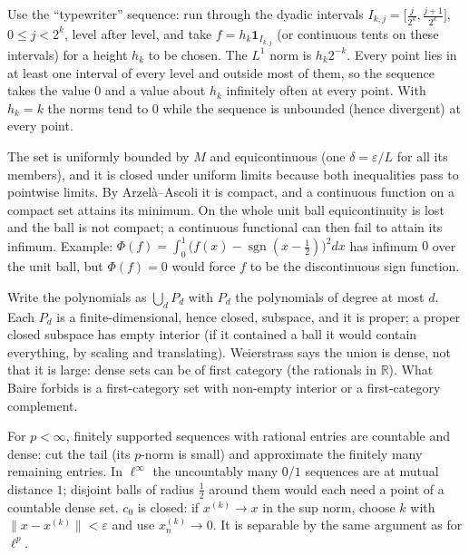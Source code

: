 \documentclass[11pt,a4paper]{article}
\begin{document}
Use the ``typewriter'' sequence: run through the dyadic intervals \(I_{k,j}=\bigl[\frac j{2^k},\frac{j+1}{2^k}\bigr]\), \(0\le j\lt2^k\), level after level, and take \(f=h_k\mathbf 1_{I_{k,j}}\) (or continuous tents on these intervals) for a height \(h_k\) to be chosen.
The \(L^1\) norm is \(h_k2^{-k}\). Every point lies in at least one interval of every level and outside most of them, so the sequence takes the value \(0\) and a value about \(h_k\) infinitely often at every point. With \(h_k=k\) the norms tend to \(0\) while the sequence is unbounded (hence divergent) at every point.

The set is uniformly bounded by \(M\) and equicontinuous (one \(\delta=\varepsilon/L\) for all its members), and it is closed under uniform limits because both inequalities pass to pointwise limits. By Arzelà--Ascoli it is compact, and a continuous function on a compact set attains its minimum.
On the whole unit ball equicontinuity is lost and the ball is not compact; a continuous functional can then fail to attain its infimum. Example: \(\Phi(f)=\int_0^1\bigl(f(x)-\operatorname{sgn}(x-\frac12)\bigr)^2dx\) has infimum \(0\) over the unit ball, but \(\Phi(f)=0\) would force \(f\) to be the discontinuous sign function.

Write the polynomials as \(\bigcup_dP_d\) with \(P_d\) the polynomials of degree at most \(d\). Each \(P_d\) is a finite-dimensional, hence closed, subspace, and it is proper; a proper closed subspace has empty interior (if it contained a ball it would contain everything, by scaling and translating).
Weierstrass says the union is dense, not that it is large: dense sets can be of first category (the rationals in \(\mathbb R\)). What Baire forbids is a first-category set with non-empty interior or a first-category complement.

For \(p\lt\infty\), finitely supported sequences with rational entries are countable and dense: cut the tail (its \(p\)-norm is small) and approximate the finitely many remaining entries.
In \(\ell^\infty\) the uncountably many \(0\)/\(1\) sequences are at mutual distance \(1\); disjoint balls of radius \(\frac12\) around them would each need a point of a countable dense set. \(c_0\) is closed: if \(x^{(k)}\to x\) in the sup norm, choose \(k\) with \(\lVert x-x^{(k)}\rVert\lt\varepsilon\) and use \(x^{(k)}_n\to0\). It is separable by the same argument as for \(\ell^p\).
\end{document}
